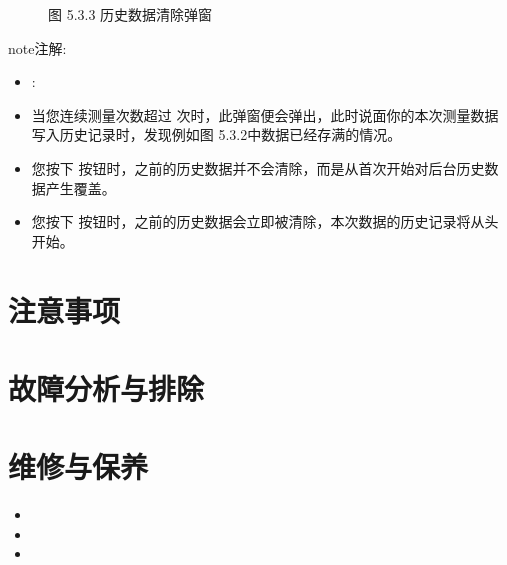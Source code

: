 \documentclass[a4paper,10pt,english]{sphinxmanual}
\begin{document}
\begin{figure}[htbp]
\centering
\capstart

\noindent{}
\caption{图 5.3.3 历史数据清除弹窗}\label{\detokenize{operation_guide:id16}}\end{figure}

\begin{sphinxadmonition}{note}{注解:}\begin{itemize}
\item {} 
\sphinxAtStartPar
{} :

\item {} 
\sphinxAtStartPar
当您连续测量次数超过  次时，此弹窗便会弹出，此时说面你的本次测量数据写入历史记录时，发现例如图 5.3.2中数据已经存满的情况。

\item {} 
\sphinxAtStartPar
您按下  按钮时，之前的历史数据并不会清除，而是从首次开始对后台历史数据产生覆盖。

\item {} 
\sphinxAtStartPar
您按下  按钮时，之前的历史数据会立即被清除，本次数据的历史记录将从头开始。

\end{itemize}
\end{sphinxadmonition}


\section{注意事项}
\label{\detokenize{note:id1}}\label{\detokenize{note::doc}}

\section{故障分析与排除}
\label{\detokenize{fault:id1}}\label{\detokenize{fault::doc}}

\section{维修与保养}
\label{\detokenize{rapair:id1}}\label{\detokenize{rapair::doc}}\begin{itemize}
\item {} 
\sphinxAtStartPar
{}

\item {} 
\sphinxAtStartPar
{}

\item {} 
\sphinxAtStartPar
{}

\end{itemize}



\renewcommand{\indexname}{索引}
\printindex
\end{document}
